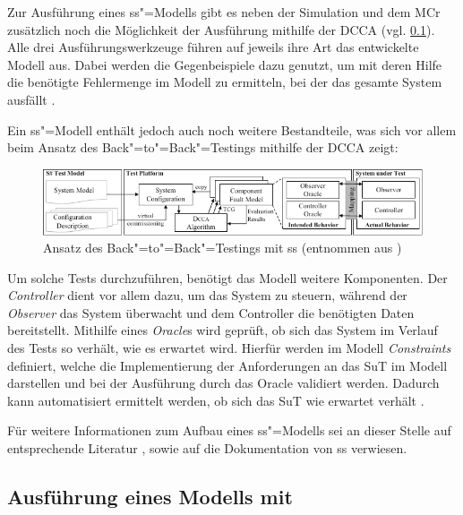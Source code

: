 Zur Ausführung eines \gls{ss}"=Modells gibt es neben der Simulation und dem \gls{MCr} zusätzlich noch die Möglichkeit der Ausführung mithilfe der \gls{DCCA} (vgl. \cref{subsec:ssharpExecution}).
Alle drei Ausführungswerkzeuge führen auf jeweils ihre Art das entwickelte Modell aus.
Dabei werden die Gegenbeispiele dazu genutzt, um mit deren Hilfe die benötigte Fehlermenge im Modell zu ermitteln, bei der das gesamte System ausfällt \cite{Habermaier2016}.

Ein \gls{ss}"=Modell enthält jedoch auch noch weitere Bestandteile, was sich vor allem beim Ansatz des Back"=to"=Back"=Testings mithilfe der \gls{DCCA} zeigt:

\begin{figure}[h]
    \includegraphics[width=\columnwidth]{./resources/b2bTestApproach.pdf}
    \caption[Ansatz des Back"=to"=Back"=Testings mit ]
    {Ansatz des Back"=to"=Back"=Testings mit \gls{ss} (entnommen aus \cite{Eberhardinger2016})}
    \label{fig:ssharpB2BTesting}
\end{figure}

Um solche Tests durchzuführen, benötigt das Modell weitere Komponenten.
Der \emph{Controller} dient vor allem dazu, um das System zu steuern, während der \emph{Observer} das System überwacht und dem Controller die benötigten Daten bereitstellt.
Mithilfe eines \emph{Oracle}s wird geprüft, ob sich das System im Verlauf des Tests so verhält, wie es erwartet wird.
Hierfür werden im Modell \emph{Constraints} definiert, welche die Implementierung der Anforderungen an das \gls{SuT} im Modell darstellen und bei der Ausführung durch das Oracle validiert werden.
Dadurch kann automatisiert ermittelt werden, ob sich das \gls{SuT} wie erwartet verhält \cite{Eberhardinger2016,Habermaier2015}.

Für weitere Informationen zum Aufbau eines \gls{ss}"=Modells sei an dieser Stelle auf entsprechende Literatur \cite{Eberhardinger2016,Habermaier2015,Habermaier2016}, sowie auf die Dokumentation von \gls{ss} \cite{SSWiki} verwiesen.

\subsection{Ausführung eines Modells mit }
\label{subsec:ssharpExecution}

